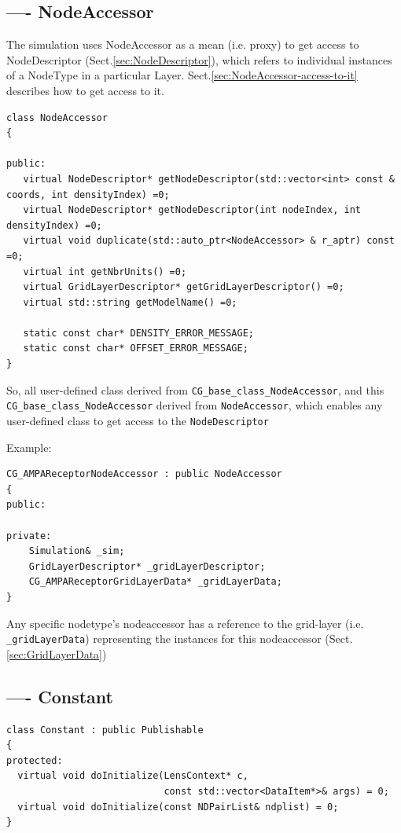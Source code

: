 \subsection{---- NodeAccessor}
\label{sec:NodeAccessor}

The simulation uses NodeAccessor as a mean (i.e. proxy) to get access to
NodeDescriptor (Sect.\ref{sec:NodeDescriptor}), which refers to individual
instances of a NodeType in a particular Layer. 
Sect.\ref{sec:NodeAccessor-access-to-it} describes how to get access to it. 


\begin{lstlisting}
class NodeAccessor
{

public:
   virtual NodeDescriptor* getNodeDescriptor(std::vector<int> const & coords, int densityIndex) =0;
   virtual NodeDescriptor* getNodeDescriptor(int nodeIndex, int densityIndex) =0;
   virtual void duplicate(std::auto_ptr<NodeAccessor> & r_aptr) const =0;
   virtual int getNbrUnits() =0;
   virtual GridLayerDescriptor* getGridLayerDescriptor() =0;
   virtual std::string getModelName() =0;
   
   static const char* DENSITY_ERROR_MESSAGE;
   static const char* OFFSET_ERROR_MESSAGE;
}
\end{lstlisting}


So, all user-defined class derived from \verb!CG_base_class_NodeAccessor!, and
this \verb!CG_base_class_NodeAccessor! derived from \verb!NodeAccessor!, which
enables any user-defined class to get access to the \verb!NodeDescriptor!

Example:
\begin{verbatim}
CG_AMPAReceptorNodeAccessor : public NodeAccessor
{
public:
    
private:
    Simulation& _sim;
    GridLayerDescriptor* _gridLayerDescriptor;
    CG_AMPAReceptorGridLayerData* _gridLayerData;
}
\end{verbatim}

Any specific nodetype's nodeaccessor has a reference to the grid-layer (i.e.
\verb!_gridLayerData!) representing the instances for this nodeaccessor (Sect.\ref{sec:GridLayerData})


\subsection{---- Constant}


\begin{lstlisting}
class Constant : public Publishable
{
protected:
  virtual void doInitialize(LensContext* c,
                            const std::vector<DataItem*>& args) = 0;
  virtual void doInitialize(const NDPairList& ndplist) = 0;
}
\end{lstlisting}


